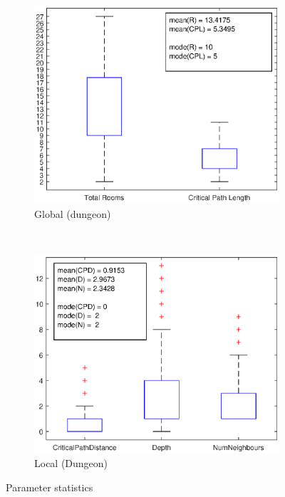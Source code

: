 \documentclass{UoYCSproject}
\begin{document}
\begin{figure}[htb]
  \centering
  \begin{subfigure}[b]{0.45\textwidth}
    \centering
    \includegraphics[width=\textwidth]{figures/data_plots/dungeon_bp.eps}
    \caption{Global (dungeon)}
  \end{subfigure}
  ~
  \begin{subfigure}[b]{0.45\textwidth}
    \centering
    \includegraphics[width=\textwidth]{figures/data_plots/room_bp.eps}
    \caption{Local (Dungeon)}
  \end{subfigure}
  \caption{Parameter statistics}
  \label{fig:dataStats}
\end{figure}
\end{document}
